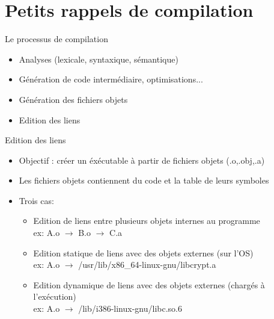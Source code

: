 \section{Petits rappels de compilation}

\frame{\tableofcontents[currentsection]}

\begin{frame}{Le processus de compilation}
	\begin{itemize}
		\item Analyses (lexicale, syntaxique, sémantique)
		\item Génération de  code intermédiaire, optimisations...
		\item Génération des fichiers objets
		\item Edition des liens
	\end{itemize}
\end{frame}

\begin{frame}{Edition des liens}
	\begin{itemize}
		\item Objectif : créer un éxécutable à partir de fichiers objets (.o,.obj,.a)
		\item Les fichiers objets contiennent du code et la table de leurs symboles
		\item Trois cas:
		\begin{itemize}
		
		\item Edition de liens entre plusieurs objets internes au programme \\
		    ex: A.o $\rightarrow$ B.o $\rightarrow$ C.a
		\item Edition statique de liens avec des objets externes (sur l'OS) \\
		    ex: A.o $\rightarrow$ /usr/lib/x86\_64-linux-gnu/libcrypt.a
		\item Edition dynamique de liens avec des objets externes (chargés à l'exécution) \\
			ex: A.o $\rightarrow$ /lib/i386-linux-gnu/libc.so.6
		\end{itemize}
	\end{itemize}
\end{frame}
